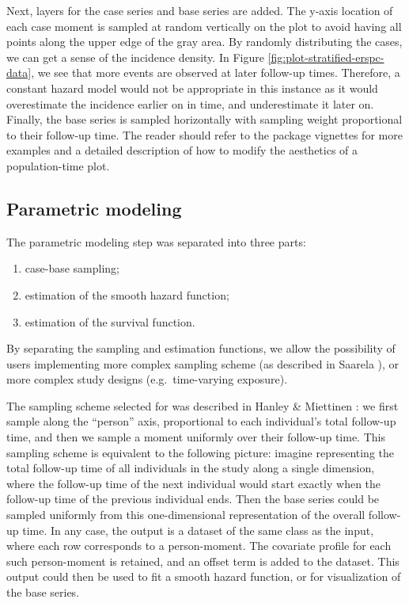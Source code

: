 Next, layers for the case series and base series are added. The y-axis
location of each case moment is sampled at random vertically on the plot
to avoid having all points along the upper edge of the gray area. By
randomly distributing the cases, we can get a sense of the incidence
density. In Figure \ref{fig:plot-stratified-erspc-data}, we see that
more events are observed at later follow-up times. Therefore, a constant
hazard model would not be appropriate in this instance as it would
overestimate the incidence earlier on in time, and underestimate it
later on. Finally, the base series is sampled horizontally with sampling
weight proportional to their follow-up time. The reader should refer to
the package vignettes for more examples and a detailed description of
how to modify the aesthetics of a population-time plot.

\hypertarget{parametric-modeling}{%
\subsection{Parametric modeling}\label{parametric-modeling}}

The parametric modeling step was separated into three parts:

\begin{enumerate}
\def\labelenumi{\arabic{enumi}.}
\tightlist
\item
  case-base sampling;
\item
  estimation of the smooth hazard function;
\item
  estimation of the survival function.
\end{enumerate}

By separating the sampling and estimation functions, we allow the
possibility of users implementing more complex sampling scheme (as
described in Saarela \citeyearpar{saarela2016case}), or more complex
study designs (e.g.~time-varying exposure).

The sampling scheme selected for  was described in
Hanley \& Miettinen \citeyearpar{hanley2009fitting}: we first sample
along the ``person'' axis, proportional to each individual's total
follow-up time, and then we sample a moment uniformly over their
follow-up time. This sampling scheme is equivalent to the following
picture: imagine representing the total follow-up time of all
individuals in the study along a single dimension, where the follow-up
time of the next individual would start exactly when the follow-up time
of the previous individual ends. Then the base series could be sampled
uniformly from this one-dimensional representation of the overall
follow-up time. In any case, the output is a dataset of the same class
as the input, where each row corresponds to a person-moment. The
covariate profile for each such person-moment is retained, and an offset
term is added to the dataset. This output could then be used to fit a
smooth hazard function, or for visualization of the base series.

